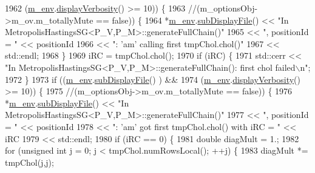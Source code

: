 \begin{DoxyCode}
{{1962             (\hyperlink{class_q_u_e_s_o_1_1_metropolis_hastings_s_g_ac8ea061e55b920e0c8f9bce5c3f20e52}{m\_env}.\hyperlink{class_q_u_e_s_o_1_1_base_environment_a1fe5f244fc0316a0ab3e37463f108b96}{displayVerbosity}() >= 10)) \{
1963     \textcolor{comment}{//(m\_optionsObj->m\_ov.m\_totallyMute == false)) \{}
1964           *\hyperlink{class_q_u_e_s_o_1_1_metropolis_hastings_s_g_ac8ea061e55b920e0c8f9bce5c3f20e52}{m\_env}.\hyperlink{class_q_u_e_s_o_1_1_base_environment_a8a0064746ae8dddfece4229b9ad374d6}{subDisplayFile}() << \textcolor{stringliteral}{"In
       MetropolisHastingsSG<P\_V,P\_M>::generateFullChain()"}
1965                                   << \textcolor{stringliteral}{", positionId = "}  << positionId
1966                                   << \textcolor{stringliteral}{": 'am' calling first tmpChol.chol()"}
1967                                   << std::endl;
1968         \}
1969         iRC = tmpChol.chol();
1970         \textcolor{keywordflow}{if} (iRC) \{
1971           std::cerr << \textcolor{stringliteral}{"In MetropolisHastingsSG<P\_V,P\_M>::generateFullChain(): first chol failed\(\backslash\)n"};
1972         \}
1973         \textcolor{keywordflow}{if} ((\hyperlink{class_q_u_e_s_o_1_1_metropolis_hastings_s_g_ac8ea061e55b920e0c8f9bce5c3f20e52}{m\_env}.\hyperlink{class_q_u_e_s_o_1_1_base_environment_a8a0064746ae8dddfece4229b9ad374d6}{subDisplayFile}()        ) &&
1974             (\hyperlink{class_q_u_e_s_o_1_1_metropolis_hastings_s_g_ac8ea061e55b920e0c8f9bce5c3f20e52}{m\_env}.\hyperlink{class_q_u_e_s_o_1_1_base_environment_a1fe5f244fc0316a0ab3e37463f108b96}{displayVerbosity}() >= 10)) \{
1975     \textcolor{comment}{//(m\_optionsObj->m\_ov.m\_totallyMute == false)) \{}
1976           *\hyperlink{class_q_u_e_s_o_1_1_metropolis_hastings_s_g_ac8ea061e55b920e0c8f9bce5c3f20e52}{m\_env}.\hyperlink{class_q_u_e_s_o_1_1_base_environment_a8a0064746ae8dddfece4229b9ad374d6}{subDisplayFile}() << \textcolor{stringliteral}{"In
       MetropolisHastingsSG<P\_V,P\_M>::generateFullChain()"}
1977                                   << \textcolor{stringliteral}{", positionId = "}  << positionId
1978                                   << \textcolor{stringliteral}{": 'am' got first tmpChol.chol() with iRC = "} << iRC
1979                                   << std::endl;
1980           \textcolor{keywordflow}{if} (iRC == 0) \{
1981             \textcolor{keywordtype}{double} diagMult = 1.;
1982             \textcolor{keywordflow}{for} (\textcolor{keywordtype}{unsigned} \textcolor{keywordtype}{int} j = 0; j < tmpChol.numRowsLocal(); ++j) \{
1983               diagMult *= tmpChol(j,j);
}}
\end{DoxyCode}
